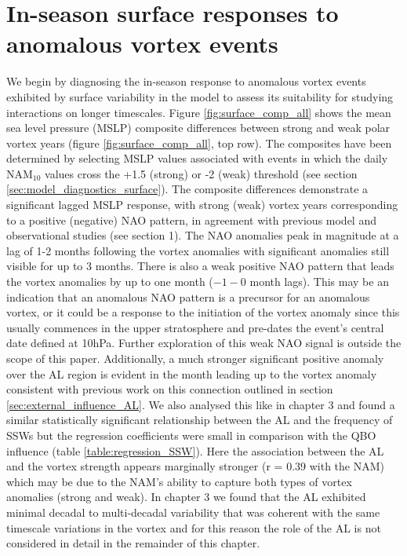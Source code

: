 \section{In-season surface responses to anomalous vortex events}
We begin by diagnosing the in-season response to anomalous vortex events exhibited by surface variability in the model to assess its suitability for studying interactions on longer timescales. Figure \ref{fig:surface_comp_all} shows the mean sea level pressure (MSLP) composite differences between strong and weak polar vortex years (figure \ref{fig:surface_comp_all}, top row). The composites have been determined by selecting MSLP values associated with events in which the daily NAM$_{10}$ values cross the +1.5 (strong) or -2 (weak) threshold (see section \ref{sec:model_diagnostics_surface}). The composite differences demonstrate a significant lagged MSLP response, with strong (weak) vortex years  corresponding to a positive (negative) NAO pattern, in agreement with previous model and observational studies (see section 1). The NAO anomalies peak in magnitude at a lag of 1-2 months following the vortex anomalies with significant anomalies still visible for up to 3 months. There is also a weak positive NAO pattern that leads the vortex anomalies by up to one month ($-1 - 0$ month lags). This may be an indication that an anomalous NAO pattern is a precursor for an anomalous vortex, or it could be a response to the initiation of the vortex anomaly since this usually commences in the upper stratosphere and pre-dates the event's central date defined at 10hPa. Further exploration of this weak NAO signal is outside the scope of this paper. Additionally, a much stronger significant positive anomaly over the AL region is evident in the month leading up to the vortex anomaly consistent with previous work on this connection outlined in section \ref{sec:external_influence_AL}. We also analysed this like in chapter 3 and found a similar statistically significant relationship between the AL and the frequency of SSWs but the regression coefficients were small in comparison with the QBO influence (table \ref{table:regression_SSW}). Here the association between the AL and the vortex strength appears marginally stronger (r = 0.39 with the NAM) which may be due to the NAM's ability to capture both types of vortex anomalies (strong and weak). In chapter 3 we found that the AL exhibited minimal decadal to multi-decadal variability that was coherent with the same timescale variations in the vortex and for this reason the role of the AL is not considered in detail in the remainder of this chapter.

